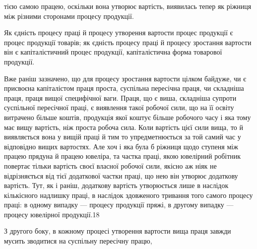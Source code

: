 тією самою працею, оскільки вона утворює вартість, виявилась
тепер як ріжниця між різними сторонами процесу продукції.

Як єдність процесу праці й процесу утворення вартости процес
продукції є процес продукції товарів; як єдність процесу
праці й процесу зростання вартости він є капіталістичний процес
продукції, капіталістична форма товарової продукції.

Вже раніш зазначено, що для процесу зростання вартости
цілком байдуже, чи є присвоєна капіталістом праця проста, суспільна
пересічна праця, чи складніша праця, праця вищої специфічної
ваги. Праця, що є виша, складніша супроти суспільної пересічної
праці, є виявлення такої робочої сили, що на її освіту витрачено
більше коштів, продукція якої коштує більше робочого
часу і яка тому має вищу вартість, ніж проста робоча сила.
Коли вартість цієї сили вища, то й виявляється вона у вищій
праці й тим то упредметнюється за той самий час у відповідно
вищих вартостях. Але хоч і яка була б ріжниця щодо ступеня
між працею прядуна й працею ювеліра, та частка праці, якою
ювелірний робітник повертає тільки вартість своєї власної робочої
сили, якісно аж ніяк не відрізняється від тієї додаткової
частки праці, що нею він утворює додаткову вартість. Тут, як і
раніш, додаткову вартість утворюється лише в наслідок кількісного
надлишку праці, в наслідок здовженого тривання того самого
процесу праці: в одному випадку — процесу продукції пряжі,
в другому випадку — процесу ювелірної продукції.18

З    другого боку, в кожному процесі утворення вартости вища
праця завжди мусить зводитися на суспільну пересічну працю,

